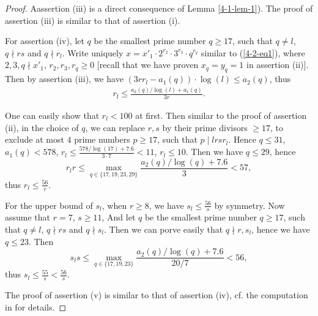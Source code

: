 \documentclass[a4paper, 12pt]{article}
\numberwithin{equation}{section}
\theoremstyle{definition}
\begin{document}
\begin{proof}
Aassertion (iii) is a direct consequence of Lemma \ref{4-1-lem-1}). The proof of assertion (iii) is similar to that of assertion (i).

For assertion (iv), let $q$ be the smallest prime number $q\ge 17$, such that $q\neq l$, $q\nmid rs$ and $q \nmid r_l$. 
Write uniquely $x = x'_1 \cdot 2^{r_2} \cdot 3^{r_3}\cdot q^{r_q}$ similar to (\ref{4-2-eq1}), where $2,3,q \nmid x'_1$, $r_2, r_3, r_q \ge 0$ [recall that we have proven $x_q = y_q = 1$ in assertion (ii)].
Then by assertion (iii), we have $(3rr_l - a_1(q))\cdot \log(l) \le a_2(q)$, thus 
\small\begin{align}  \label{4-2-eq4}
r_l \le \frac{a_2(q)/\log(l)+a_1(q)}{3r} .
\end{align}\normalsize

One can easily show that $r_l < 100$ at first.
Then similar to the proof of assertion (ii), in the choice of $q$, we can replace $r,s$ by their prime divisors $\ge 17$, to exclude at most $4$ prime numbers $p\ge 17$, such that $p\mid l rs r_l$. 
Hence $q \le 31$, $a_1(q) < 578$, $r_l \le \frac{578/\log(17) + 7.6 }{3\cdot 7} < 11$, $r_l \le 10$. 
Then we have $q \le 29$, hence 
$$r_l r \le \max_{q\in \{17,19,23,29\}} \frac{a_2(q) / \log(q) + 7.6}{3} < 57,$$
thus $r_l \le \frac{56}{r}$.

For the upper bound of $s_l$, when $r \ge 8$, we have $s_l \le \frac{56}{s}$ by symmetry. Now assume that $r = 7$, $s\ge 11$, And let $q$ be the smallest prime number $q\ge 17$, such that $q\neq l$, $q\nmid rs$ and $q \nmid s_l$. Then we can porve easily that $q\nmid r, s_l$, hence we have $q\le 23$.
Then  
$$s_l s \le \max_{q\in \{17,19,23\}} \frac{a_2(q) / \log(q) + 7.6}{20 / 7} < 56,$$
thus $s_l \le \frac{55}{s} < \frac{56}{s}$.

The proof of assertion (v) is similar to that of assertion (iv), cf. the computation in \cite{code_of_zpzhou} for details.
\end{proof}
\end{document}
